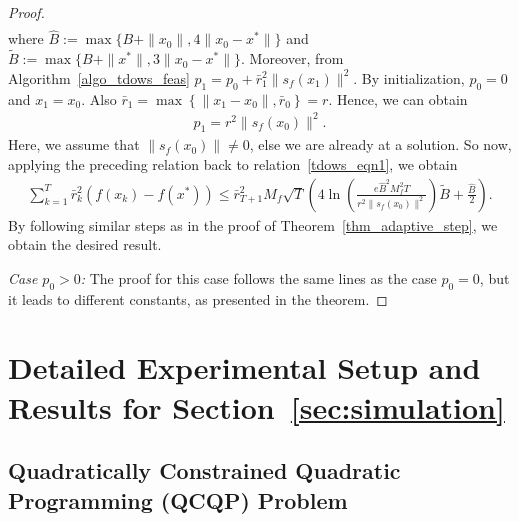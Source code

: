\documentclass{article}
\theoremstyle{plain}
\theoremstyle{definition}
\theoremstyle{remark}
\begin{document}
\begin{proof}
\begin{align}
\end{align}
where $\widehat B := \max\{B + \|x_0\|, 4 \|x_0 - x^*\|\}$ and $\widetilde B := \max\{B + \|x^*\|, 3 \|x_0 - x^*\|\}$. Moreover, from Algorithm~\ref{algo_tdows_feas} $p_1 = p_0 + \bar r_1^2 \|s_f(x_1)\|^2$. By initialization, $p_0 = 0$ and $x_1 = x_0$. Also $\bar r_1 = \max\left\{ \|x_1 - x_0\|, \bar{r}_{0} \right\} = r$. Hence, we can obtain
\begin{align*}
    p_1 = r^2 \|s_f(x_0)\|^2 .
\end{align*}
Here, we assume that $\|s_f(x_0)\| \neq 0$, else we are already at a solution. So now, applying the preceding relation back to relation~\eqref{tdows_eqn1}, we obtain
\begin{align*}
    \sum_{k=1}^{T} \bar{r}_k^2 \left( f(x_k) - f(x^*) \right) \leq \bar r_{T+1}^2 M_f \sqrt{T} \left( 4 \ln \left( \frac{e \widehat B^2 M_f^2 T}{r^2 \|s_f(x_0)\|^2} \right) \widetilde B + \frac{\widehat B}{2} \right) .
\end{align*}
By following similar steps as in the proof of Theorem~\ref{thm_adaptive_step}, we obtain the desired result.


\noindent\textit{Case $p_0 > 0$:} The proof for this case follows the same lines as the case $p_0 = 0$, but it leads to different constants, as presented in the theorem.
\end{proof}



\section{Detailed Experimental Setup and Results for Section~\ref{sec:simulation}}\label{app_simulation}

\subsection{Quadratically Constrained Quadratic Programming (QCQP) Problem}\label{app_qcqp}
\end{document}
